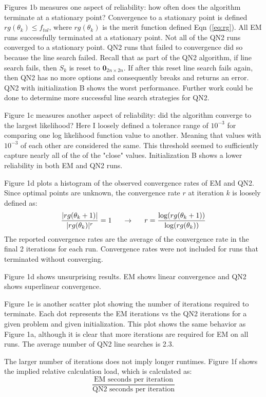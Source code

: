 \documentclass[letter,12pt]{article}
\begin{document}
Figures 1b measures one aspect of reliability: how often does the algorithm terminate at a stationary point?  Convergence to a stationary point is defined $rg(\theta_k) \leq f_{tol}$, where $rg(\theta_k)$ is the merit function defined Eqn (\ref{eq:rg}).  All EM runs successfully terminated at a stationary point.  Not all of the QN2 runs converged to a stationary point.  QN2 runs that failed to convergence did so because the line search failed.  Recall that as part of the QN2 algorithm, if line search fails, then $S_k$ is reset to $\boldsymbol{0}_{2n \times 2n}$.  If after this reset line search fails again, then QN2 has no more options and consequently breaks and returns an error.  QN2 with initialization B shows the worst performance.  Further work could be done to determine more successful line search strategies for QN2.

Figure 1c measures another aspect of reliability: did the algorithm converge to the largest likelihood?  Here I loosely defined a tolerance range of $10^{-3}$ for comparing one log likelihood function value to another.  Meaning that values with $10^{-3}$ of each other are considered the same.  This threshold seemed to sufficiently capture nearly all of the of the "close" values.  Initialization B shows a lower reliability in both EM and QN2 runs.

Figure 1d plots a histogram of the observed convergence rates of EM and QN2.  Since optimal points are unknown, the convergence rate $r$ at iteration $k$ is loosely defined as:
\[
\frac{|rg(\theta_k+1)|}{|rg(\theta_k)|^r} = 1
\indent
\rightarrow
\indent
r = \frac{\log(rg(\theta_k+1))}{\log(rg(\theta_k))}
\]
The reported convergence rates are the average of the convergence rate in the final 2 iterations for each run.  Convergence rates were not included for runs that terminated without converging.

Figure 1d shows unsurprising results.  EM shows linear convergence and QN2 shows superlinear convergence.

Figure 1e is another scatter plot showing the number of iterations required to terminate.  Each dot represents the EM iterations vs the QN2 iterations for a given problem and given initialization.  This plot shows the same behavior as Figure 1a, although it is clear that more iterations are required for EM on all runs.  The average number of QN2 line searches is 2.3.

The larger number of iterations does not imply longer runtimes.  Figure 1f shows the implied relative calculation load, which is calculated as:
\[
\frac{\text{EM seconds per iteration}}{\text{QN2 seconds per iteration}}
\]
\end{document}
